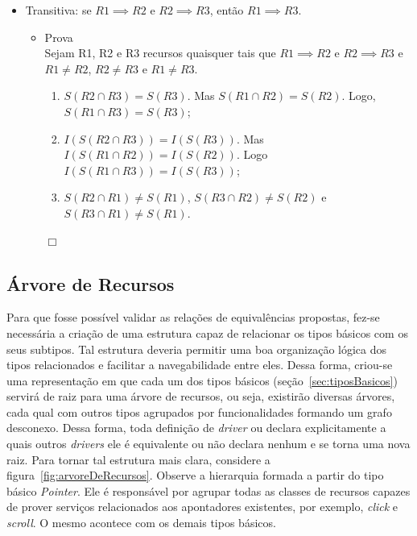 \begin{itemize}
	\item Transitiva: se $R1 \implies R2$ e $R2 \implies R3$, então $R1 \implies R3$.

	\begin{itemize}
		\item Prova \\

		Sejam R1, R2 e R3 recursos quaisquer tais que $R1 \implies R2$ e $R2 \implies R3$ e $R1 \neq R2$, $R2 \neq R3$ e $R1 \neq R3$. \\

		\begin{enumerate}
			
			\item $S(R2 \cap R3) = S(R3)$. Mas $S(R1 \cap R2) = S(R2)$. Logo, $S(R1 \cap R3) = S(R3)$; \\
			\item $I(S(R2 \cap R3)) = I(S(R3))$. Mas $I(S(R1 \cap R2)) = I(S(R2))$. Logo $I(S(R1 \cap R3)) = I(S(R3))$; \\
			\item $S(R2 \cap R1) \neq S(R1)$, $S(R3 \cap R2) \neq S(R2)$ e $S(R3 \cap R1) \neq S(R1)$.
		\end{enumerate}
		\begin{flushright}$\Box$\end{flushright}
	\end{itemize}	
\end{itemize}

\subsection{Árvore de Recursos}
\label{subsec:arvoreDeRecursos}

Para que fosse possível validar as relações de equivalências propostas, fez-se necessária a criação de uma estrutura capaz de relacionar os tipos básicos com os seus subtipos. Tal estrutura deveria permitir uma boa organização lógica dos tipos relacionados e facilitar a navegabilidade entre eles. Dessa forma, criou-se uma representação em que cada um dos tipos básicos (seção~\ref{sec:tiposBasicos}) servirá de raiz para uma árvore de recursos, ou seja, existirão diversas árvores, cada qual com outros tipos agrupados por funcionalidades formando um grafo desconexo. Dessa forma, toda definição de \emph{driver} ou declara explicitamente a quais outros \emph{drivers} ele é equivalente ou não declara nenhum e se torna uma nova raiz. Para tornar tal estrutura mais clara, considere a figura~\ref{fig:arvoreDeRecursos}. Observe a hierarquia formada a partir do tipo básico \emph{Pointer}. Ele é responsável por agrupar todas as classes de recursos capazes de prover serviços relacionados aos apontadores existentes, por exemplo, \emph{click} e \emph{scroll}. O mesmo acontece com os demais tipos básicos.

